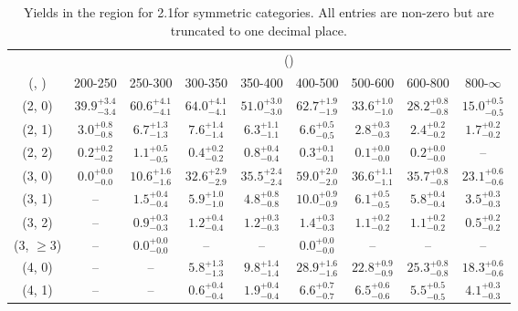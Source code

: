 \begin{table}[h!]
\tiny
\centering
\caption{Yields in the \mmj region for 2.1\ifb for symmetric categories. All entries are non-zero but are truncated to one decimal place.\label{tab:yieldsnodata_mumu_comb_sym}}
\begin{tabular}
{ccccccccc}
	\hline\hline
	& \multicolumn{8}{c}{\scalht (\gev)} \\ 
	 (\njet,  \nb) & 200-250 & 250-300 & 300-350 & 350-400 & 400-500 & 500-600 & 600-800 & 800-$\infty$ \\ [0.8ex] 
\hline
	(2, 0) & $39.9^{+ 3.4 }_{- 3.4 }$ & $60.6^{+ 4.1 }_{- 4.1 }$ & $64.0^{+ 4.1 }_{- 4.1 }$ & $51.0^{+ 3.0 }_{- 3.0 }$ & $62.7^{+ 1.9 }_{- 1.9 }$ & $33.6^{+ 1.0 }_{- 1.0 }$ & $28.2^{+ 0.8 }_{- 0.8 }$ & $15.0^{+ 0.5 }_{- 0.5 }$ \\[0.5ex] 
	(2, 1) & $3.0^{+ 0.8 }_{- 0.8 }$ & $6.7^{+ 1.3 }_{- 1.3 }$ & $7.6^{+ 1.4 }_{- 1.4 }$ & $6.3^{+ 1.1 }_{- 1.1 }$ & $6.6^{+ 0.5 }_{- 0.5 }$ & $2.8^{+ 0.3 }_{- 0.3 }$ & $2.4^{+ 0.2 }_{- 0.2 }$ & $1.7^{+ 0.2 }_{- 0.2 }$ \\[0.5ex] 
	(2, 2) & $0.2^{+ 0.2 }_{- 0.2 }$ & $1.1^{+ 0.5 }_{- 0.5 }$ & $0.4^{+ 0.2 }_{- 0.2 }$ & $0.8^{+ 0.4 }_{- 0.4 }$ & $0.3^{+ 0.1 }_{- 0.1 }$ & $0.1^{+ 0.0 }_{- 0.0 }$ & $0.2^{+ 0.0 }_{- 0.0 }$ & -- \\[0.5ex] 
	(3, 0) & $0.0^{+ 0.0 }_{- 0.0 }$ & $10.6^{+ 1.6 }_{- 1.6 }$ & $32.6^{+ 2.9 }_{- 2.9 }$ & $35.5^{+ 2.4 }_{- 2.4 }$ & $59.0^{+ 2.0 }_{- 2.0 }$ & $36.6^{+ 1.1 }_{- 1.1 }$ & $35.7^{+ 0.8 }_{- 0.8 }$ & $23.1^{+ 0.6 }_{- 0.6 }$ \\[0.5ex] 
	(3, 1) & -- & $1.5^{+ 0.4 }_{- 0.4 }$ & $5.9^{+ 1.0 }_{- 1.0 }$ & $4.8^{+ 0.8 }_{- 0.8 }$ & $10.0^{+ 0.9 }_{- 0.9 }$ & $6.1^{+ 0.5 }_{- 0.5 }$ & $5.8^{+ 0.4 }_{- 0.4 }$ & $3.5^{+ 0.3 }_{- 0.3 }$ \\[0.5ex] 
	(3, 2) & -- & $0.9^{+ 0.3 }_{- 0.3 }$ & $1.2^{+ 0.4 }_{- 0.4 }$ & $1.2^{+ 0.3 }_{- 0.3 }$ & $1.4^{+ 0.3 }_{- 0.3 }$ & $1.1^{+ 0.2 }_{- 0.2 }$ & $1.1^{+ 0.2 }_{- 0.2 }$ & $0.5^{+ 0.2 }_{- 0.2 }$ \\[0.5ex] 
	(3, $\ge3$) & -- & $0.0^{+ 0.0 }_{- 0.0 }$ & -- & -- & $0.0^{+ 0.0 }_{- 0.0 }$ & -- & -- & -- \\[0.5ex] 
	(4, 0) & -- & -- & $5.8^{+ 1.3 }_{- 1.3 }$ & $9.8^{+ 1.4 }_{- 1.4 }$ & $28.9^{+ 1.6 }_{- 1.6 }$ & $22.8^{+ 0.9 }_{- 0.9 }$ & $25.3^{+ 0.8 }_{- 0.8 }$ & $18.3^{+ 0.6 }_{- 0.6 }$ \\[0.5ex] 
	(4, 1) & -- & -- & $0.6^{+ 0.4 }_{- 0.4 }$ & $1.9^{+ 0.4 }_{- 0.4 }$ & $6.6^{+ 0.7 }_{- 0.7 }$ & $6.5^{+ 0.6 }_{- 0.6 }$ & $5.5^{+ 0.5 }_{- 0.5 }$ & $4.1^{+ 0.3 }_{- 0.3 }$ \\[0.5ex] 

\end{tabular}
\end{table}
